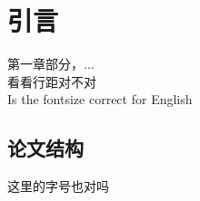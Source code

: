 \chapter{引言}
\label{chap:introduction}

\fontsize{12bp}{14.4pt}

第一章\cite{marolf_transcending_2020}部分\cite{coleman_black_1988}，...\\
看看行距对不对\\
Is the fontsize correct for English

\section{论文结构}

这里的字号也对吗